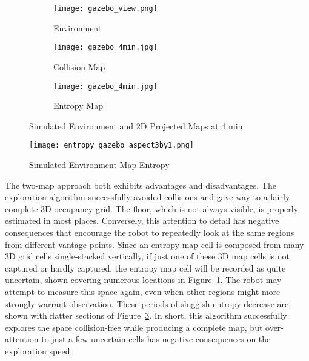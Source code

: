 \begin{figure}
	\centering
	\begin{subfigure}[t]{0.3\columnwidth}
           	\centering
          	\texttt{[image: gazebo\_view.png]}
        		\caption{Environment}
    	\end{subfigure}
		\hspace*{0.05cm}
    	\begin{subfigure}[t]{0.3\columnwidth}
           	\centering
          	\texttt{[image: gazebo\_4min.jpg]}
        		\caption{Collision Map}
    	\end{subfigure}
	\hspace*{0.1cm}
	\begin{subfigure}[t]{0.3\columnwidth}
           	\centering
          	\texttt{[image: gazebo\_4min.jpg]}
        		\caption{Entropy Map}
		\label{fig:sim2DmapsC}
    	\end{subfigure}
\caption{Simulated Environment and 2D Projected Maps at $4$ min}
\label{fig:sim2Dmaps}
\end{figure}

\begin{figure}[!t]
	\centering
	\texttt{[image: entropy\_gazebo\_aspect3by1.png]}
	\caption{Simulated Environment Map Entropy}
	\label{fig:simH}
\end{figure}

The two-map approach both exhibits advantages and disadvantages. The exploration algorithm successfully avoided collisions and gave way to a fairly complete 3D occupancy grid. The floor, which is not always visible, is properly estimated in most places. Conversely, this attention to detail has negative consequences that encourage the robot to repeatedly look at the same regions from different vantage points.
Since an entropy map cell is composed from many 3D grid cells single-stacked vertically, if just one of these 3D map cells is not captured or hardly captured, the entropy map cell will be recorded as quite uncertain, shown covering numerous locations in Figure~\ref{fig:sim2DmapsC}. The robot may attempt to measure this space again, even when other regions might more strongly warrant observation. These periods of sluggish entropy decrease are shown with flatter sections of Figure~\ref{fig:simH}. In short, this algorithm successfully explores the space collision-free while producing a complete map, but over-attention to just a few uncertain cells has negative consequences on the exploration speed.






